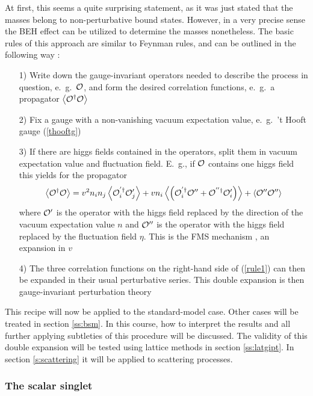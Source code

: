 \documentclass[final,twoside,12pt]{article}
\newcommand*{\no}{\noindent}
\newcommand*{\be}{\begin{equation}}
\newcommand*{\ee}{\end{equation}}
\newcommand*{\pref}[1]{(\ref{#1})}
\newcommand*{\1}{1\!\!\!\bot}
\newcommand*{\la}{\left\langle}
\newcommand*{\ra}{\right\rangle}
\newcommand*{\op}{{\cal O}}
\begin{document}
At first, this seems a quite surprising statement, as it was just stated that the masses belong to non-perturbative bound states. However, in a very precise sense \cite{Frohlich:1980gj,Frohlich:1981yi} the BEH effect can be utilized to determine the masses nonetheless. The basic rules of this approach are similar to Feynman rules, and can be outlined in the following way \cite{Maas:2012ct,Egger:2017tkd,Torek:2016ede}:
\begin{itemize}
 \item[1)] Write down the gauge-invariant operators needed to describe the process in question, e.\ g.\ $\op$, and form the desired correlation functions, e.\ g.\ a propagator $\la\op^\dagger\op\ra$
 \item[2)] Fix a gauge with a non-vanishing vacuum expectation value, e.\ g.\ 't Hooft gauge \pref{thooftg}
 \item[3)] If there are higgs fields contained in the operators, split them in vacuum expectation value and fluctuation field. E.\ g., if $\op$ contains one higgs field this yields for the propagator
 \be
 \la\op^\dagger\op\ra=v^2n_in_j\la\op_i^{'\dagger}\op_j'\ra+vn_i\la\left(\op_i^{'\dagger}\op''+\op^{''\dagger}\op_i'\right)\ra+\la\op''\op''\ra\label{rule1}
 \ee
 \no where $\op'$ is the operator with the higgs field replaced by the direction of the vacuum expectation value $n$ and $\op''$ is the operator with the higgs field replaced by the fluctuation field $\eta$. This is the FMS mechanism \cite{Frohlich:1980gj,Frohlich:1981yi}, an expansion in $v$
 \item[4)] The three correlation functions on the right-hand side of \pref{rule1} can then be expanded in their usual perturbative series. This double expansion is then gauge-invariant perturbation theory
\end{itemize}
This recipe will now be applied to the standard-model case. Other cases will be treated in section \ref{ss:bsm}. In this course, how to interpret the results and all further applying subtleties of this procedure will be discussed. The validity of this double expansion will be tested using lattice methods in section \ref{ss:latgipt}. In section \ref{s:scattering} it will be applied to scattering processes.

\subsubsection{The scalar singlet}\label{sss:ss}
\end{document}
